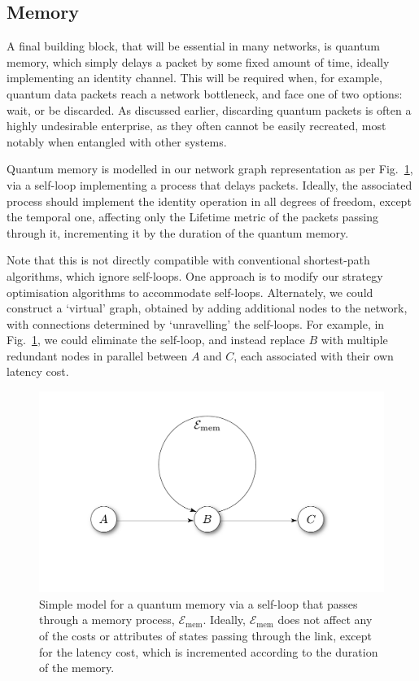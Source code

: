 \documentclass[aps,rmp,twocolumn,amsmath,amssymb,nofootinbib,superscriptaddress]{revtex4}
\begin{document}
%
%

\subsection{Memory} \label{sec:memory}

A final building block, that will be essential in many networks, is quantum memory, which simply delays a packet by some fixed amount of time, ideally implementing an identity channel. This will be required when, for example, quantum data packets reach a network bottleneck, and face one of two options: wait, or be discarded. As discussed earlier, discarding quantum packets is often a highly undesirable enterprise, as they often cannot be easily recreated, most notably when entangled with other systems.

Quantum memory is modelled in our network graph representation as per Fig.~\ref{fig:memory}, via a self-loop implementing a process that delays packets. Ideally, the associated process should implement the identity operation in all degrees of freedom, except the temporal one, affecting only the {\sc Lifetime} metric of the packets passing through it, incrementing it by the duration of the quantum memory.

Note that this is not directly compatible with conventional shortest-path algorithms, which ignore self-loops. One approach is to modify our strategy optimisation algorithms to accommodate self-loops. Alternately, we could construct a `virtual' graph, obtained by adding additional nodes to the network, with connections determined by `unravelling' the self-loops. For example, in Fig.~\ref{fig:memory}, we could eliminate the self-loop, and instead replace $B$ with multiple redundant nodes in parallel between $A$ and $C$, each associated with their own latency cost.

\begin{figure}[!htb]
\includegraphics[width=0.7\columnwidth]{memory}
\caption{Simple model for a quantum memory via a self-loop that passes through a memory process, $\mathcal{E}_\mathrm{mem}$. Ideally, $\mathcal{E}_\mathrm{mem}$ does not affect any of the costs or attributes of states passing through the link, except for the latency cost, which is incremented according to the duration of the memory.} \label{fig:memory}
\end{figure}
\end{document}
